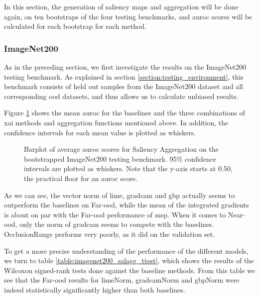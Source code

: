 \documentclass[UKenglish]{uiomasterthesis} %
\theoremstyle{definition}
\begin{document}
In this section, the generation of saliency maps and aggregation will be done again, on ten bootstraps of the four testing benchmarks, and \ac{auroc} scores will be calculated for each bootstrap for each method.


\subsubsection{ImageNet200}

As in the preceding section, we first investigate the results on the ImageNet200 testing benchmark. As explained in section \ref{section:testing_environment}, this benchmark consists of held out samples from the ImageNet200 dataset and all corresponding \ac{ood} datasets, and thus allows us to calculate unbiased results. 

Figure \ref{fig:imagenet200_salagg_bootstrap_barplot} shows the mean \ac{auroc} for the baselines and the three combinations of \ac{xai} methods and aggregation functions mentioned above. In addition, the confidence intervals for each mean value is plotted as whiskers.

\begin{figure}[hbtp]
    \begin{center}
        
    \end{center}
    \caption[ImageNet200 Saliency Aggregation Bootstrap]{Barplot of average \ac{auroc} scores for Saliency Aggregation on the bootstrapped ImageNet200 testing benchmark. 95\% confidence intervals are plotted as whiskers. Note that the y-axis starts at 0.50, the practical floor for an \ac{auroc} score.}
    \label{fig:imagenet200_salagg_bootstrap_barplot}
\end{figure}

As we can see, the vector norm of \ac{lime}, \ac{gradcam} and \ac{gbp} actually seems to outperform the baselines on Far-\ac{ood}, while the mean of the integrated gradients is about on par with the Far-\ac{ood} performance of \ac{msp}. When it comes to Near-\ac{ood}, only the norm of \ac{gradcam} seems to compete with the baselines. OcclusionRange performs very poorly, as it did on the validation set.

To get a more precise understanding of the performance of the different models, we turn to table \ref{table:imagenet200_salagg_ttest}, which shows the results of the Wilcoxon signed-rank tests done against the baseline methods. From this table we see that the Far-\ac{ood} results for \ac{lime}Norm, \ac{gradcam}Norm and \ac{gbp}Norm were indeed statistically significantly higher than both baselines.
\end{document}
